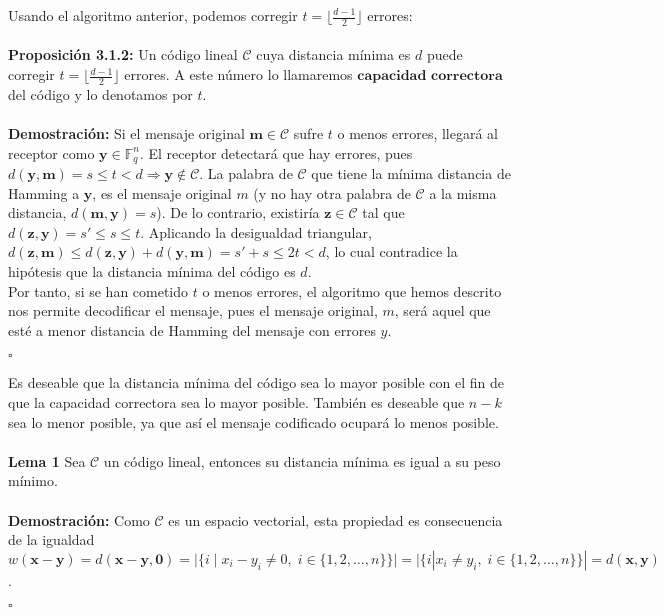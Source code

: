\documentclass[11pt,spanish]{book}
\newcommand{\qed}{\begin{flushright} $\square$ \end{flushright}}
\begin{document}
Usando el algoritmo anterior, podemos corregir $t=\lfloor\frac{d-1}{2}\rfloor$ errores:\\
\\ \textbf{Proposición 3.1.2: } Un código lineal $\mathcal{C}$ cuya distancia mínima es $d$ puede corregir $t=\lfloor\frac{d-1}{2}\rfloor$ errores. A este número lo llamaremos $\textbf{capacidad correctora}$ del código y lo denotamos por $t$.\\
\\ \textbf{Demostración:}
Si el mensaje original $\mathbf{m}\in\mathcal{C}$ sufre $t$ o menos errores, llegará al receptor como $\mathbf{y}\in\mathbb{F}_q^{n}$. El receptor detectará que hay errores, pues $d(\mathbf{y},\mathbf{m})=s\leq t<d\Rightarrow \mathbf{y}\notin \mathcal{C}$. La palabra de $\mathcal{C}$ que tiene la mínima distancia de Hamming a $\mathbf{y}$, es el mensaje original $m$ (y no hay otra palabra de $\mathcal{C}$ a la misma distancia, $d(\mathbf{m},\mathbf{y})=s$). De lo contrario, existiría $\mathbf{z}\in \mathcal{C}$ tal que $d(\mathbf{z},\mathbf{y})=s'\leq s\leq t$. Aplicando la desigualdad triangular, $d(\mathbf{z},\mathbf{m})\leq d(\mathbf{z},\mathbf{y})+d(\mathbf{y},\mathbf{m})=s'+s\leq 2t<d$, lo cual contradice la hipótesis que la distancia mínima del código es $d$.\\

Por tanto, si se han cometido $t$ o menos errores, el algoritmo que hemos descrito nos permite decodificar el mensaje, pues el mensaje original, $m$, será aquel que esté a menor distancia de Hamming del mensaje con errores $y$. 
\qed

Es deseable que la distancia mínima del código sea lo mayor posible con el fin de que la capacidad correctora sea lo mayor posible. También es deseable que $n-k$ sea lo menor posible, ya que así el mensaje codificado ocupará lo menos posible.\\
\\ \textbf{Lema 1} Sea $\mathcal{C}$ un código lineal, entonces su distancia mínima es igual a su peso mínimo.\\
\\ \textbf{Demostración:} Como $\mathcal{C}$ es un espacio vectorial, esta propiedad es consecuencia de la igualdad $w(\mathbf{x}-\mathbf{y})=d(\mathbf{x}-\mathbf{y},\mathbf{0})=|\{i\;|\;x_{i}-y_{i}\neq 0,\;i\in \{1,2,\ldots,n\}\}|=|\{i|x_{i}\neq y_{i},\;i\in \{1,2,\ldots,n\}\}|=d(\mathbf{x},\mathbf{y})$.
\qed
\end{document}
